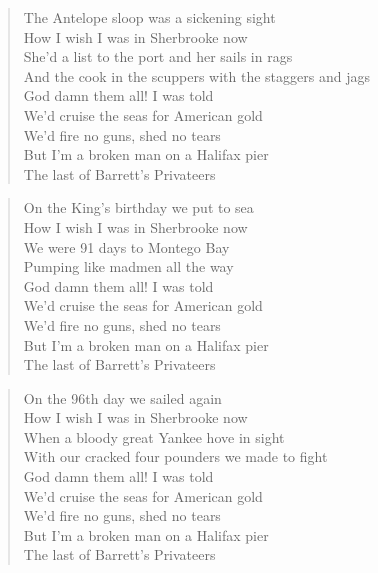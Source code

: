 \documentclass[8pt,twoside]{extarticle}
\newenvironment{xverse}{
	\interlinepenalty 10000
	\begin{verse}
	\begin{minipage}{\linewidth}
	\parskip 5pt
	\vspace{-6pt}
	}
	{
	\end{minipage}
	\end{verse}
	\penalty 0
	\vspace{-6pt}
	}
\begin{document}
\begin{xverse}
The Antelope sloop was a sickening sight \\
How I wish I was in Sherbrooke now \\
She’d a list to the port and her sails in rags \\
And the cook in the scuppers with the staggers and jags \\
God damn them all! I was told \\
We’d cruise the seas for American gold \\
We’d fire no guns, shed no tears \\
But I’m a broken man on a Halifax pier \\
The last of Barrett’s Privateers \\
\end{xverse}

\begin{xverse}
On the King’s birthday we put to sea \\
How I wish I was in Sherbrooke now \\
We were 91 days to Montego Bay \\
Pumping like madmen all the way \\
God damn them all! I was told \\
We’d cruise the seas for American gold \\
We’d fire no guns, shed no tears \\
But I’m a broken man on a Halifax pier \\
The last of Barrett’s Privateers \\
\end{xverse}

\begin{xverse}
On the 96th day we sailed again \\
How I wish I was in Sherbrooke now \\
When a bloody great Yankee hove in sight \\
With our cracked four pounders we made to fight \\
God damn them all! I was told \\
We’d cruise the seas for American gold \\
We’d fire no guns, shed no tears \\
But I’m a broken man on a Halifax pier \\
The last of Barrett’s Privateers \\
\end{xverse}
\end{document}
